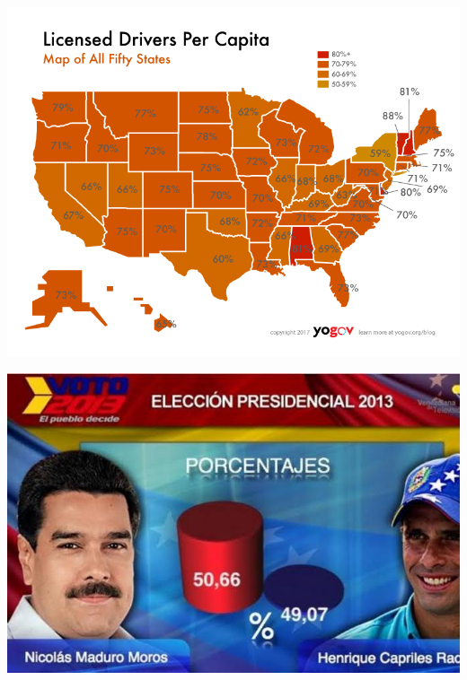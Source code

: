 \documentclass{beamer}
\begin{document}
 \begin{frame}\centering\includegraphics[width=\textwidth,keepaspectratio]{graphcrimes/FXBQtakXEAAFVc7.png}\end{frame}
 \begin{frame}\centering\includegraphics[width=\textwidth,keepaspectratio]{graphcrimes/FXz7CxPVQAAJVuL.jpeg}\end{frame}
\end{document}
